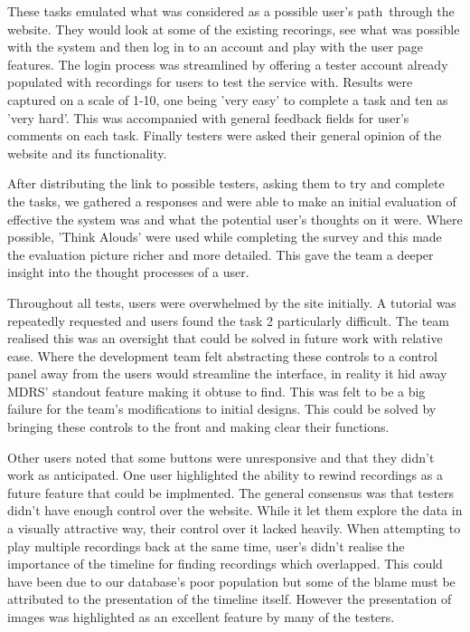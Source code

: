 \documentclass{l3proj}
\begin{document}
These tasks emulated what was considered as a possible user's path through the website. They would look at some of the existing recorings, see what was possible with the system and then log in to an account and play with the user page features. The login process was streamlined by offering a tester account already populated with recordings for users to test the service with. Results were captured on a scale of 1-10, one being 'very easy' to complete a task and ten as 'very hard'. This was accompanied with general feedback fields for user's comments on each task. Finally testers were asked their general opinion of the website and its functionality.

After distributing the link to possible testers, asking them to try and complete the tasks, we gathered a responses and were able to make an initial evaluation of effective the system was and what the potential user's thoughts on it were. Where possible, 'Think Alouds' were used while completing the survey and this made the evaluation picture richer and more detailed. This gave the team a deeper insight into the thought processes of a user.

Throughout all tests, users were overwhelmed by the site initially. A tutorial was repeatedly requested and users found the task 2 particularly difficult. The team realised this was an oversight that could be solved in future work with relative ease. Where the development team felt abstracting these controls to a control panel away from the users would streamline the interface, in reality it hid away MDRS' standout feature making it obtuse to find. This was felt to be a big failure for the team's modifications to initial designs. This could be solved by bringing these controls to the front and making clear their functions.

Other users noted that some buttons were unresponsive and that they didn't work as anticipated. One user highlighted the ability to rewind recordings as a future feature that could be implmented. The general consensus was that testers didn't have enough control over the website. While it let them explore the data in a visually attractive way, their control over it lacked heavily. When attempting to play multiple recordings back at the same time, user's didn't realise the importance of the timeline for finding recordings which overlapped. This could have been due to our database's poor population but some of the blame must be attributed to the presentation of the timeline itself. However the presentation of images was highlighted as an excellent feature by many of the testers.
\end{document}
